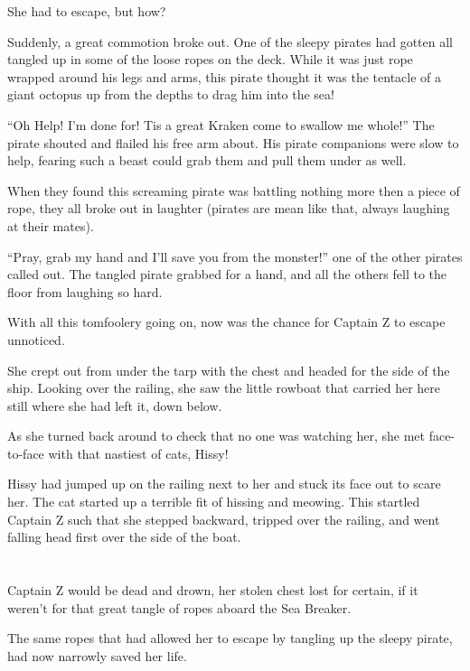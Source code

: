 \documentclass[12pt]{extbook}
\begin{document}
  She had to escape, but how?
  
  Suddenly, a great commotion broke out. One of the sleepy pirates had
  gotten all tangled up in some of the loose ropes on the deck. While it
  was just rope wrapped around his legs and arms, this pirate thought it
  was the tentacle of a giant octopus up from the depths to drag him into
  the sea!
  
  \enquote{Oh Help! I'm done for! Tis a great Kraken come to swallow me
  whole!} The pirate shouted and flailed his free arm about. His pirate
  companions were slow to help, fearing such a beast could grab them and
  pull them under as well.
  
  When they found this screaming pirate was battling nothing more then a
  piece of rope, they all broke out in laughter (pirates are mean like
  that, always laughing at their mates).
  
  \enquote{Pray, grab my hand and I'll save you from the monster!} one of
  the other pirates called out. The tangled pirate grabbed for a hand, and
  all the others fell to the floor from laughing so hard.
  
  With all this tomfoolery going on, now was the chance for Captain Z to
  escape unnoticed.
  
  She crept out from under the tarp with the chest and headed for the side
  of the ship. Looking over the railing, she saw the little rowboat that
  carried her here still where she had left it, down below.
  
  As she turned back around to check that no one was watching her, she met
  face-to-face with that nastiest of cats, Hissy!
  
  Hissy had jumped up on the railing next to her and stuck its face out to
  scare her. The cat started up a terrible fit of hissing and meowing.
  This startled Captain Z such that she stepped backward, tripped over the
  railing, and went falling head first over the side of the boat.
  
  \section{}\label{section-7}
  
  Captain Z would be dead and drown, her stolen chest lost for certain, if
  it weren't for that great tangle of ropes aboard the Sea Breaker.
  
  The same ropes that had allowed her to escape by tangling up the sleepy
  pirate, had now narrowly saved her life.
  
\end{document}
